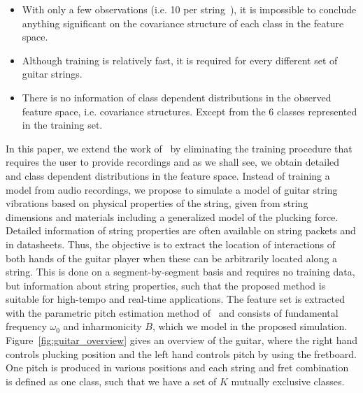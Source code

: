 \documentclass{article}
\begin{document}
\begin{sloppy}
\begin{itemize}
    \item With only a few observations (i.e. 10 per string~\cite{hjerrild::icassp19}), it is impossible to conclude anything significant on the covariance structure of each class in the feature space.
    \item Although training is relatively fast, it is required for every different set of guitar strings.
        \item There is no information of class dependent distributions in the observed feature space, i.e. covariance structures. Except from the 6 classes represented in the training set.
\end{itemize}
In this paper, we extend the work of~\cite{hjerrild::icassp19} by eliminating the training procedure that requires the user to provide recordings and as we shall see, we obtain detailed and class dependent distributions in the feature space. Instead of training a model from audio recordings, we propose to simulate a model of guitar string vibrations based on physical properties of the string, given from string dimensions and materials including a generalized model of the plucking force. Detailed information of string properties are often available on string packets and in datasheets. Thus, the objective is to extract the location of interactions of both hands of the guitar player when these can be arbitrarily located along a string. This is done on a segment-by-segment basis and requires no training data, but information about string properties, such that the proposed method is suitable for high-tempo and real-time applications. The feature set is extracted with the parametric pitch estimation method of~\cite{hjerrild::icassp19} and consists of fundamental frequency $\omega_0$ and inharmonicity $B$, which we model in the proposed simulation. Figure~\ref{fig:guitar_overview} gives an overview of the guitar, where the right hand controls plucking position and the left hand controls pitch by using the fretboard. One pitch is produced in various positions and each string and fret combination is defined as one class, such that we have a set of $K$ mutually exclusive classes. 
%
%


\end{sloppy}
\end{document}
